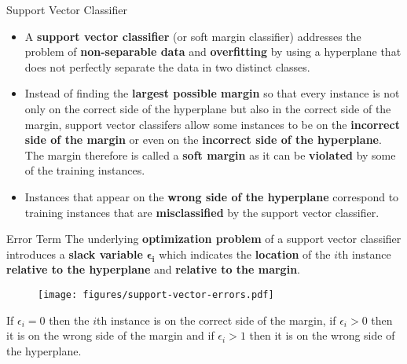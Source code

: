 \documentclass[document.tex]{subfiles}
\begin{document}
    \begin{frame}{Support Vector Classifier}
        \begin{itemize}
            \item A \textbf{support vector classifier} (or soft margin classifier) addresses the problem of \textbf{non-separable data} and \textbf{overfitting} by using a hyperplane that does not perfectly separate the data in two distinct classes.
            \item Instead of finding the \textbf{largest possible margin} so that every instance is not only on the correct side of the hyperplane but also in the correct side of the margin, support vector classifers allow some instances to be on the \textbf{incorrect side of the margin} or even on the \textbf{incorrect side of the hyperplane}. The margin therefore is called a \textbf{soft margin} as it can be \textbf{violated} by some of the training instances.
            \item Instances that appear on the \textbf{wrong side of the hyperplane} correspond to training instances that are \textbf{misclassified} by the support vector classifier.
        \end{itemize}
    \end{frame}

    \begin{frame}{Error Term}
        The underlying \textbf{optimization problem} of a support vector classifier introduces a \textbf{slack variable} $\boldsymbol{\epsilon_i}$ which indicates the \textbf{location} of the $i$th instance \textbf{relative to the hyperplane} and \textbf{relative to the margin}.
        \begin{figure}
            \label{fig:support-vector-errors}
            \texttt{[image: figures/support-vector-errors.pdf]}
        \end{figure}

        If $\epsilon_i = 0$ then the $i$th instance is on the correct side of the margin, if $\epsilon_i > 0$ then it is on the wrong side of the margin and if $\epsilon_i > 1$ then it is on the wrong side of the hyperplane.
    \end{frame}
    
\end{document}
